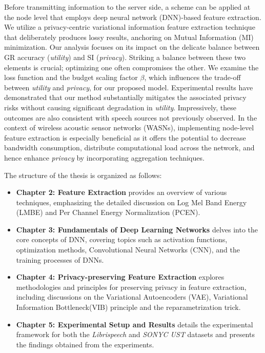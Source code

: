 Before transmitting information to the server side, a scheme can be applied at the node level that employs deep neural network (DNN)-based feature extraction. We utilize a privacy-centric variational information feature extraction technique that deliberately produces lossy results, anchoring on Mutual Information (MI) minimization. Our analysis focuses on its impact on the delicate balance between GR accuracy (\textit{utility}) and SI (\textit{privacy}). Striking a balance between these two elements is crucial; optimizing one often compromises the other. We examine the loss function and the budget scaling factor \( \beta  \), which influences the trade-off between \textit{utility} and \textit{privacy}, for our proposed model. Experimental results have demonstrated that our method substantially mitigates the associated privacy risks without causing significant degradation in \textit{utility}. Impressively, these outcomes are also consistent with speech sources not previously observed. In the context of wireless acoustic sensor networks (WASNs), implementing node-level feature extraction is especially beneficial as it offers the potential to decrease bandwidth consumption, distribute computational load across the network, and hence enhance \textit{privacy} by incorporating aggregation techniques.

\pagebreak

The structure of the thesis is organized as follows:

\begin{itemize}
    \item \textbf{Chapter 2: Feature Extraction} provides an overview of various techniques, emphasizing the detailed discussion on Log Mel Band Energy (LMBE) and Per Channel Energy Normalization (PCEN).
    
    \item \textbf{Chapter 3: Fundamentals of Deep Learning Networks} delves into the core concepts of DNN, covering topics such as activation functions, optimization methods, Convolutional Neural Networks (CNN), and the training processes of DNNs.
    
    \item \textbf{Chapter 4: Privacy-preserving Feature Extraction} explores methodologies and principles for preserving privacy in feature extraction, including discussions on the Variational Autoencoders (VAE), Variational Information Bottleneck(VIB) principle and the reparametrization trick.
    
    \item \textbf{Chapter 5: Experimental Setup and Results} details the experimental framework for both the \textit{Librispeech} and \textit{SONYC UST} datasets and presents the findings obtained from the experiments.
\end{itemize}

